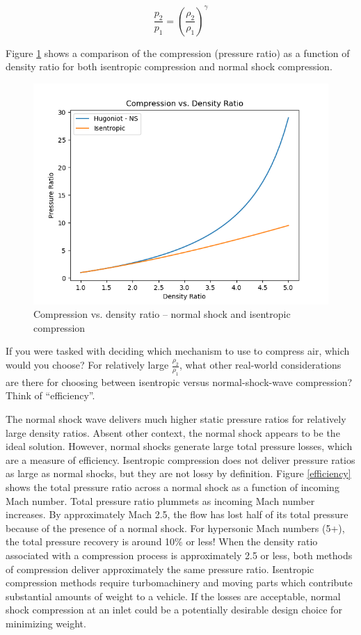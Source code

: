 \documentclass[../main.tex]{subfiles}
\begin{document}
\[
    \frac{p_2}{p_1} = \left({\frac{\rho_2}{\rho_1}}\right)^\gamma
\]

Figure \ref{compression} shows a comparison of the compression (pressure ratio) as a function of density ratio for both isentropic compression and normal shock compression.

\begin{figure}[h!]
    \centering
    \includegraphics[scale=0.75]{../../images/problem_1/hugoniot_vs_isentropic_compression.png}
    \caption{Compression vs. density ratio -- normal shock and isentropic compression}
    \label{compression}
\end{figure}

\newpage


If you were tasked with deciding which mechanism to use to compress air, which would you choose? 
For relatively large \(\frac{\rho_2}{\rho_1}\), what other real-world considerations are there for choosing between isentropic versus normal-shock-wave compression? 
Think of “efficiency”.

\discussion{}

The normal shock wave delivers much higher static pressure ratios for relatively large density ratios. 
Absent other context, the normal shock appears to be the ideal solution.
However, normal shocks generate large total pressure losses, which are a measure of efficiency.
Isentropic compression does not deliver pressure ratios as large as normal shocks, but they are not lossy by definition.
Figure \ref{efficiency} shows the total pressure ratio across a normal shock as a function of incoming Mach number.
Total pressure ratio plummets as incoming Mach number increases. 
By approximately Mach 2.5, the flow has lost half of its total pressure because of the presence of a normal shock.
For hypersonic Mach numbers (5+), the total pressure recovery is around 10\% or less!
When the density ratio associated with a compression process is approximately 2.5 or less, both methods of compression deliver approximately the same pressure ratio.
Isentropic compression methods require turbomachinery and moving parts which contribute substantial amounts of weight to a vehicle.
If the losses are acceptable, normal shock compression at an inlet could be a potentially desirable design choice for minimizing weight.
\end{document}
